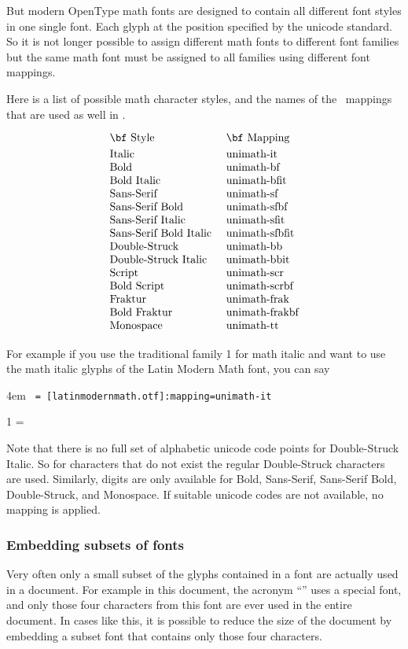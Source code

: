 But modern OpenType math fonts are designed to contain all different font
styles in one single font. Each glyph at the position specified by the unicode standard.
So it is not longer possible to assign different math fonts to different font families but
the same math font must be assigned to all families using different font mappings.

Here is a list of possible math character styles, and the names of the \XeTeX\ mappings
that are used as well in \HiTeX.


$$\vbox{\halign{#\hfil\quad &#\hfil\cr
\bf Style               &\bf Mapping\cr
\noalign{\smallskip}
Italic                   &unimath-it\cr
Bold                     &unimath-bf\cr
Bold Italic              &unimath-bfit\cr
Sans-Serif               &unimath-sf\cr
Sans-Serif Bold          &unimath-sfbf\cr
Sans-Serif Italic        &unimath-sfit\cr
Sans-Serif Bold Italic   &unimath-sfbfit\cr
Double-Struck            &unimath-bb\cr
Double-Struck Italic     &unimath-bbit\cr
Script                   &unimath-scr\cr
Bold Script              &unimath-scrbf\cr
Fraktur                  &unimath-frak\cr
Bold Fraktur             &unimath-frakbf\cr
Monospace                &unimath-tt\cr
}}$$

For example if you use the traditional family 1 for math italic and want to use
the math italic glyphs of the Latin Modern Math font, you can say
\medskip
{\parskip 0pt\hangindent 4em%
\tt {} = [latinmodernmath.otf]:mapping=unimath-it\par
{} 1 =   \par}
\medskip
\itemize
\item Note that there is no full set of alphabetic unicode code points for Double-Struck Italic. So for characters that do not exist the regular Double-Struck characters are used.
Similarly, digits are only available for Bold, Sans-Serif, Sans-Serif Bold, Double-Struck, and Monospace. If suitable unicode codes are not available, no mapping is applied.
\enditemize

\subsubsection{Embedding subsets of fonts}
Very often only a small subset of the glyphs contained in a font are actually used in
a document. For example in this document, the acronym ``\HINT'' uses a special font,
and only those four characters from this font are ever used in the entire document.
In cases like this, it is possible to reduce the size of the document by embedding
a subset font that contains only those four characters.

